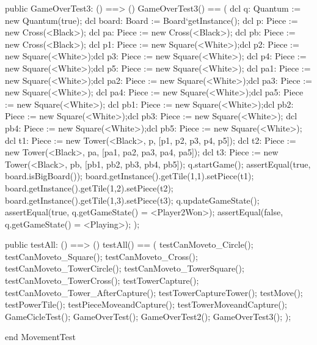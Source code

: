 \begin{vdmpp}[breaklines=true]
    public GameOverTest3: () ==> ()
  GameOverTest3() == (
  dcl q: Quantum := new Quantum(true);
  dcl board: Board := Board`getInstance();
  dcl p: Piece := new Cross(<Black>);
  dcl pa: Piece := new Cross(<Black>);
  dcl pb: Piece := new Cross(<Black>);
  dcl p1: Piece := new Square(<White>);dcl p2: Piece := new Square(<White>);dcl p3: Piece := new Square(<White>);
  dcl p4: Piece := new Square(<White>);dcl p5: Piece := new Square(<White>);
  dcl pa1: Piece := new Square(<White>);dcl pa2: Piece := new Square(<White>);dcl pa3: Piece := new Square(<White>);
  dcl pa4: Piece := new Square(<White>);dcl pa5: Piece := new Square(<White>);
  dcl pb1: Piece := new Square(<White>);dcl pb2: Piece := new Square(<White>);dcl pb3: Piece := new Square(<White>);
  dcl pb4: Piece := new Square(<White>);dcl pb5: Piece := new Square(<White>);
  dcl t1: Piece := new Tower(<Black>, p, [p1, p2, p3, p4, p5]);
  dcl t2: Piece := new Tower(<Black>, pa, [pa1, pa2, pa3, pa4, pa5]);
  dcl t3: Piece := new Tower(<Black>, pb, [pb1, pb2, pb3, pb4, pb5]);
  q.startGame();
  assertEqual(true, board.isBigBoard());
  board.getInstance().getTile(1,1).setPiece(t1);
  board.getInstance().getTile(1,2).setPiece(t2);
  board.getInstance().getTile(1,3).setPiece(t3);
  q.updateGameState();
  assertEqual(true, q.getGameState() = <Player2Won>);
  assertEqual(false, q.getGameState() = <Playing>);
 );
 
  public testAll: () ==> ()
  testAll() == (
    testCanMoveto_Circle();
    testCanMoveto_Square();
   testCanMoveto_Cross();
    testCanMoveto_TowerCircle();
    testCanMoveto_TowerSquare();
    testCanMoveto_TowerCross();
   testTowerCapture();
   testCanMoveto_Tower_AfterCapture();
   testTowerCaptureTower();
   testMove();
   testPowerTile();  
   testPieceMoveandCapture(); 
   testTowerMoveandCapture();
   GameCicleTest();
   GameOverTest();
   GameOverTest2();
   GameOverTest3();
  );
  
end MovementTest
\end{vdmpp}
\bigskip
